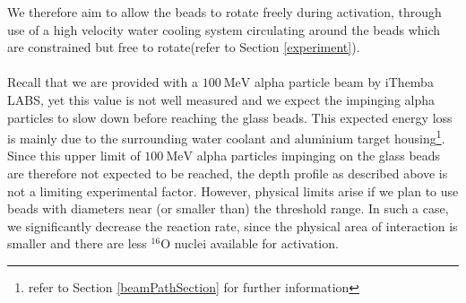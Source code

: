\documentclass[]{article}
\begin{document}
We therefore aim to allow the beads to rotate freely during activation, through use of a high velocity water cooling system circulating around the beads which are constrained but free to rotate(refer to Section \ref{experiment}).\\\\
Recall that we are provided with a $\SI{100}{\mega \electronvolt}$ alpha particle beam by iThemba LABS, yet this value is not well measured and we expect the impinging alpha particles to slow down before reaching the glass beads. This expected energy loss is mainly due to the surrounding water coolant and aluminium target housing\footnote{refer to Section \ref{beamPathSection} for further information}. Since this upper limit of $\SI{100}{\mega \electronvolt}$ alpha particles impinging on the glass beads are therefore not expected to be reached, the depth profile as described above is not a limiting experimental factor. However, physical limits arise if we plan to use beads with diameters near (or smaller than) the threshold range. In such a case, we significantly decrease the reaction rate, since the physical area of interaction is smaller and there are less ${}^{16}$O nuclei available for activation. 
\end{document}
